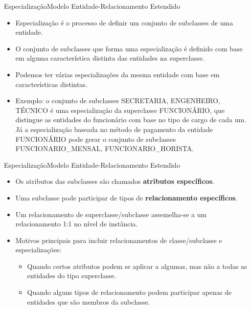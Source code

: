 \documentclass[t]{beamer}
\begin{document}
\begin{ftst}{Especialização}{Modelo Entidade-Relacionamento Estendido}
\small
\begin{itemize}
    \item Especialização é o processo de definir um conjunto de subclasses de uma entidade.
    \item O conjunto de subclasses que forma uma especialização é definido com base em alguma característica distinta das entidades na superclasse.
    \item Podemos ter várias especializações da mesma entidade com base em características distintas. 
    \item Exemplo: o conjunto de subclasses {SECRETARIA, ENGENHEIRO, TÉCNICO} é uma especialização da superclasse FUNCIONÁRIO, que distingue as entidades do funcionário com base no tipo de cargo de cada um. Já a especialização baseada no método de pagamento da entidade FUNCIONÁRIO pode gerar o conjunto de subclasses {FUNCIONARIO\_MENSAL, FUNCIONARIO\_HORISTA}.
\end{itemize}
\end{ftst}


\begin{ftst}{Especialização}{Modelo Entidade-Relacionamento Estendido}
\small
\begin{itemize}
    \item Os atributos das subclasses são chamados \textbf{atributos específicos}.
    \item Uma subclasse pode participar de tipos de \textbf{relacionamento específicos}.
    \item Um relacionamento de superclasse/subclasse assemelha-se a um relacionamento 1:1 no nível de instância.
    \item Motivos principais para incluir relacionamentos de classe/subclasse e especializações:
    \begin{itemize}
        \item Quando certos atributos podem se aplicar a algumas, mas não a todas as entidades do tipo superclasse.
        \item Quando alguns tipos de relacionamento podem participar apenas de entidades que são membros da subclasse.
    \end{itemize}
\end{itemize}
\end{ftst}

\end{document}
